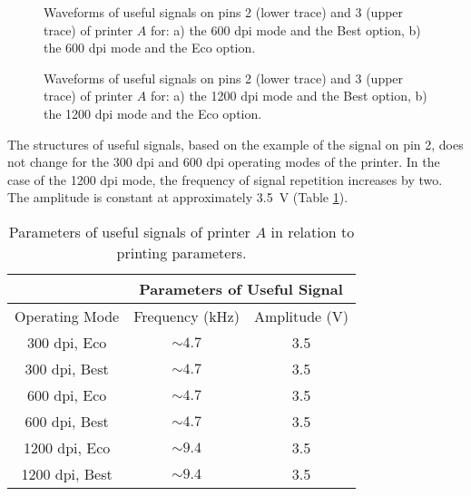 \documentclass[10pt,a4paper]{article}
\begin{document}
\begin{figure*}[ht]
    \centering
    \hfil
    \caption{Waveforms of useful signals on pins 2 (lower trace) and 3 (upper
        trace) of printer $A$ for: a) the 600 dpi mode and the Best
        option, b) the 600 dpi mode and the Eco option.}
    \label{figure:Figure_05}
\end{figure*}

\begin{figure*}[ht]
    \centering
    \hfil
    \caption{Waveforms of useful signals on pins 2 (lower trace) and 3 (upper
        trace) of printer $A$ for: a) the 1200 dpi mode and the Best
        option, b) the 1200 dpi mode and the Eco option.}
    \label{figure:Figure_06}
\end{figure*}

The structures of useful signals, based on the example of the signal on pin
2, does not change for the 300 dpi and 600 dpi operating modes of the
printer. In the case of the 1200 dpi mode, the frequency of signal repetition
increases by two. The amplitude is constant at approximately \SI{3.5}{\volt}
(Table \ref{table:Table_1}).

\begin{table}[ht]
    \centering
    \begin{tabular}{|c|c|c|}
        \hline
        & \multicolumn{2}{c|}{Parameters of Useful Signal} \\
        \hline
        Operating Mode & Frequency (\si{\kilo\hertz})
                       & Amplitude (\si{\volt}) \\
        \hline
        300 dpi, Eco   & $\sim 4.7$ & 3.5 \\
        300 dpi, Best  & $\sim 4.7$ & 3.5 \\
        600 dpi, Eco   & $\sim 4.7$ & 3.5 \\
        600 dpi, Best  & $\sim 4.7$ & 3.5 \\
        1200 dpi, Eco  & $\sim 9.4$ & 3.5 \\
        1200 dpi, Best & $\sim 9.4$ & 3.5 \\
        \hline
    \end{tabular}
    \caption{Parameters of useful signals of printer $A$ in relation to
        printing parameters.}
    \label{table:Table_1}
\end{table}
\end{document}
